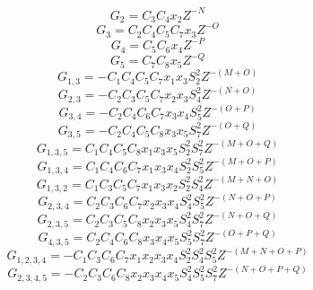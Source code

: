 \documentclass{osa-article}
\begin{document}
 \begin{equation}
G_2=C_3C_4x_2Z^{-N}
\label{eqa22}
\end{equation}
 \begin{equation}
G_3=C_2C_4C_5C_7x_3Z^{-O}
\label{eqa23}
\end{equation}
 \begin{equation}
G_4=C_5C_6x_4Z^{-P}
\label{eqa24}
\end{equation}
 \begin{equation}
G_5=C_7C_8x_5Z^{-Q}
\label{eqa25}
\end{equation}
 \begin{equation}
G_{1,3}=-C_1C_4C_5C_7x_1x_3{S^2_2}Z^{-(M+O)}
\label{eqa26}
\end{equation}
 \begin{equation}
G_{2,3}=-C_2C_3C_5C_7x_2x_3{S^2_4}Z^{-(N+O)}
\label{eqa27}
\end{equation}
 \begin{equation}
G_{3,4}=-C_2C_4C_6C_7x_3x_4{S^2_5}Z^{-(O+P)}
\label{eqa28}
\end{equation}
 \begin{equation}
G_{3,5}=-C_2C_4C_5C_8x_3x_5{S^2_7}Z^{-(O+Q)}
\label{eqa29}
\end{equation}
 \begin{equation}
G_{1,3,5}=C_1C_4C_5C_8x_1x_3x_5{S^2_2}{S^2_7}Z^{-(M+O+Q)}
\label{eqa30}
\end{equation}
 \begin{equation}
G_{1,3,4}=C_1C_4C_6C_7x_1x_3x_4{S^2_2}{S^2_5}Z^{-(M+O+P)}
\label{eqa31}
\end{equation}
 \begin{equation}
G_{1,3,2}=C_1C_3C_5C_7x_1x_3x_2{S^2_2}{S^2_4}Z^{-(M+N+O)}
\label{eqa32}
\end{equation}
 \begin{equation}
G_{2,3,4}=C_2C_3C_6C_7x_2x_3x_4{S^2_4}{S^2_5}Z^{-(N+O+P)}
\label{eqa33}
\end{equation}
 \begin{equation}
G_{2,3,5}=C_2C_3C_5C_8x_2x_3x_5{S^2_4}{S^2_7}Z^{-(N+O+Q)}
\label{eqa34}
\end{equation}
 \begin{equation}
G_{4,3,5}=C_2C_4C_6C_8x_3x_4x_5{S^2_5}{S^2_7}Z^{-(O+P+Q)}
\label{eqa35}
\end{equation}
 \begin{equation}
G_{1,2,3,4}=-C_1C_3C_6C_7x_1x_2x_3x_4{S^2_2}{S^2_4}{S^2_5}Z^{-(M+N+O+P)}
\label{eqa36}
\end{equation}
 \begin{equation}
G_{2,3,4,5}=-C_2C_3C_6C_8x_2x_3x_4x_5{S^2_4}{S^2_5}{S^2_7}Z^{-(N+O+P+Q)}
\label{eqa37}
\end{equation}
\end{document}
